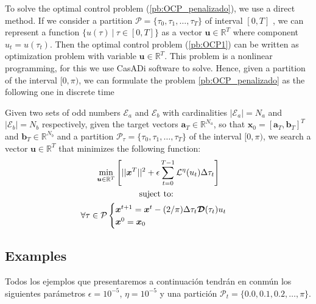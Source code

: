 To solve the optimal control problem (\ref{pb:OCP_penalizado}), we use a direct method. 
%
If we consider a partition $\mathcal{P} = \{\tau_0,\tau_1,\dots,\tau_{T}\}$ of interval $[0,T]$ , we can represent a function $\{ u(\tau) \ | \ \tau \in [0,T]\}$ as a vector $\bm{u} \in \mathbb{R}^{T}$ where component $u_t = u(\tau_t)$. 
%
Then the optimal control problem (\ref{pb:OCP1}) can be written as optimization problem with variable $\bm{u} \in \mathbb{R}^{T}$. This problem is a nonlinear programming, for this we use CasADi software to solve. 
%
Hence, given a partition of the interval $[0,\pi)$, we can formulate the problem \ref{pb:OCP_penalizado} as the following one in discrete time
\newline

\begin{problem}\label{pb:numOCP2}
Given two sets of odd numbers $\mathcal{E}_a$ and $\mathcal{E}_b$ with cardinalities $|\mathcal{E}_a| = N_a$ and $|\mathcal{E}_b| = N_b$ respectively, given the target vectors $\bm{a}_T  \in \mathbb{R}^{N_a}$, so that $\bm{x}_0 = [\bm{a}_T,\bm{b}_T]^T$ and $\bm{b}_T \in \mathbb{R}^{N_b}$ and a partition $\mathcal{P}_\tau = \{\tau_0,\tau_1,\dots,\tau_{T}\}$ of the interval $[0,\pi)$, we search a vector $\bm{u} \in \mathbb{R}^{T}$ that minimizes the following function:
\begin{gather}
        \min_{\bm{u} \in \mathbb{R}^{T} } 
        \Bigg[ 
        || \bm{x}^{T}||^2
        + \epsilon  \sum_{t=0}^{T-1} \mathcal{L}^\eta(u_{t}) \Delta\tau_t  \Bigg]  \\
        \notag \text{suject to: } \\
        \forall \tau \in \mathcal{P} \begin{cases}
            \bm{x}^{t+1} = \bm{x}^{t} - (2/\pi)\Delta \tau_t \bm{\mathcal{D}}(\tau_t)u_t \\
            \bm{x}^0 = \bm{x}_0
        \end{cases} 
\end{gather}
\end{problem}

\subsection{Examples}

Todos los ejemplos que presentaremos a continuación tendrán en conmún los siguientes parámetros $\epsilon = 10^{-5}$, $\eta = 10^{-5}$ y una partición $\mathcal{P}_t = \{0.0 , 0.1, 0.2 ,\dots,\pi\}$.

